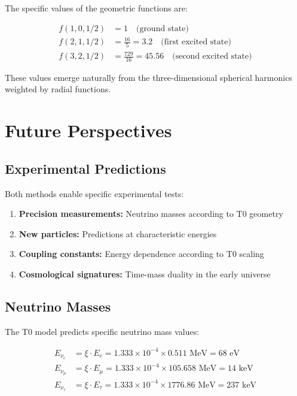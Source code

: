 \documentclass[12pt,a4paper]{article}
\begin{document}
	The specific values of the geometric functions are:
	
	\begin{align}
		f(1,0,1/2) &= 1 \quad \text{(ground state)} \\
		f(2,1,1/2) &= \frac{16}{5} = 3.2 \quad \text{(first excited state)} \\
		f(3,2,1/2) &= \frac{729}{16} = 45.56 \quad \text{(second excited state)}
	\end{align}
	
	These values emerge naturally from the three-dimensional spherical harmonics weighted by radial functions.
	
	\section{Future Perspectives}
	\label{sec:future_perspectives}
	
	\subsection{Experimental Predictions}
	\label{subsec:experimental_predictions}
	
	Both methods enable specific experimental tests:
	
	\begin{enumerate}
		\item \textbf{Precision measurements:} Neutrino masses according to T0 geometry
		\item \textbf{New particles:} Predictions at characteristic energies
		\item \textbf{Coupling constants:} Energy dependence according to T0 scaling
		\item \textbf{Cosmological signatures:} Time-mass duality in the early universe
	\end{enumerate}
	
	\subsection{Neutrino Masses}
	\label{subsec:neutrino_masses}
	
	The T0 model predicts specific neutrino mass values:
	
	\begin{align}
		E_{\nu_e} &= \xi \cdot E_e = 1.333 \times 10^{-4} \times 0.511 \text{ MeV} = 68 \text{ eV} \\
		E_{\nu_\mu} &= \xi \cdot E_\mu = 1.333 \times 10^{-4} \times 105.658 \text{ MeV} = 14 \text{ keV} \\
		E_{\nu_\tau} &= \xi \cdot E_\tau = 1.333 \times 10^{-4} \times 1776.86 \text{ MeV} = 237 \text{ keV}
	\end{align}
	
\end{document}
